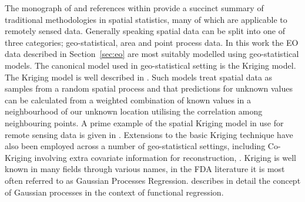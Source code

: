 The monograph of \cite{cressie_statistics_2010} and references within provide a succinct summary of traditional methodologies in spatial statistics, many of which are applicable to remotely sensed data. Generally speaking spatial data can be split into one of three categories; geo-statistical, area and point process data. In this work the EO data described in Section~\ref{sec:eo}  are most suitably modelled using geo-statistical models. The canonical model used in geo-statistical setting is the Kriging model. The Kriging model is well described in \cite{stein_interpolation_1999}. Such models treat spatial data as samples from a random spatial process and that predictions for unknown values can be calculated from a weighted combination of known values in a neighbourhood of our unknown location utilising the correlation among neighbouring points. A prime example of the spatial Kriging model in use for remote sensing data is given in \cite{rossi_kriging_1994}. Extensions to the basic Kriging technique have also been employed across a number of geo-statistical settings, including Co-Kriging involving extra covariate information for reconstruction, \cite{zhang_restoration_2009}.  Kriging is well known in many fields through various names, in the FDA literature it is most often referred to as Gaussian Processes Regression. \citeauthor{shi_gaussian_2011} describes in detail the concept of Gaussian processes in the context of functional regression. 

